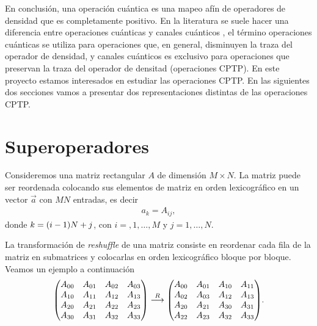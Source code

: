 
En conclusión, una operación cuántica es una mapeo afín de 
operadores de densidad que es completamente positivo. 
En la literatura se suele hacer una diferencia entre operaciones cuánticas
y canales cuánticos \cite{weedbrook2012gaussian}, el término operaciones 
cuánticas se utiliza para operaciones que, en general, disminuyen la traza 
del operador de densidad, y canales cuánticos es exclusivo para operaciones 
que preservan la traza del operador de densitad (operaciones CPTP). En 
este proyecto estamos interesados en estudiar las operaciones CPTP. 
En las siguientes dos secciones vamos a presentar dos representaciones
distintas de las operaciones CPTP. 



\section{Superoperadores}

Consideremos una matriz rectangular $A$ de dimensión $M\times N$.
La matriz puede ser reordenada colocando sus elementos de matriz en 
orden lexicográfico en un vector $\vec{a}$ con $MN$ entradas, es decir
\begin{align}
a_k=A_{ij}, 
\end{align}
donde $k=\qty(i-1)N+j$, con $i=,1,\ldots,M$ y $j=1,\ldots,N$.

La transformación de \textit{reshuffle} de una matriz consiste 
en reordenar cada fila de la matriz en submatrices y colocarlas en 
orden lexicográfico bloque por bloque. Veamos un ejemplo a continuación
\begin{align}
\mqty(
A_{00}&A_{01}&A_{02}&A_{03}\\
A_{10}&A_{11}&A_{12}&A_{13}\\
A_{20}&A_{21}&A_{22}&A_{23}\\
A_{30}&A_{31}&A_{32}&A_{33})
\stackrel{R}{\longrightarrow}
\mqty(
A_{00}&A_{01}&A_{10}&A_{11}\\
A_{02}&A_{03}&A_{12}&A_{13}\\
A_{20}&A_{21}&A_{30}&A_{31}\\
A_{22}&A_{23}&A_{32}&A_{33}).
\end{align}

